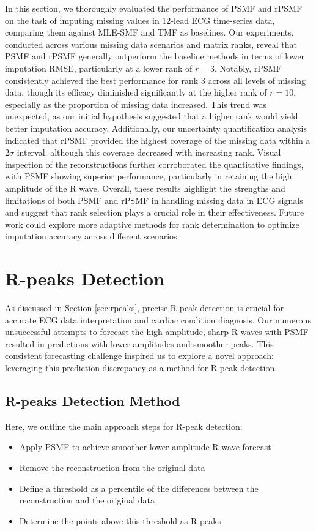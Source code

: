 \documentclass{mldsmsc}
\begin{document}
\noindent In this section, we thoroughly evaluated the performance of PSMF and rPSMF on the task of imputing missing values in 12-lead ECG time-series data, comparing them against MLE-SMF and TMF as baselines. Our experiments, conducted across various missing data scenarios and matrix ranks, reveal that PSMF and rPSMF generally outperform the baseline methods in terms of lower imputation RMSE, particularly at a lower rank of $r = 3$. Notably, rPSMF consistently achieved the best performance for rank 3 across all levels of missing data, though its efficacy diminished significantly at the higher rank of $r = 10$, especially as the proportion of missing data increased. This trend was unexpected, as our initial hypothesis suggested that a higher rank would yield better imputation accuracy. Additionally, our uncertainty quantification analysis indicated that rPSMF provided the highest coverage of the missing data within a $2\sigma$ interval, although this coverage decreased with increasing rank. Visual inspection of the reconstructions further corroborated the quantitative findings, with PSMF showing superior performance, particularly in retaining the high amplitude of the R wave. Overall, these results highlight the strengths and limitations of both PSMF and rPSMF in handling missing data in ECG signals and suggest that rank selection plays a crucial role in their effectiveness. Future work could explore more adaptive methods for rank determination to optimize imputation accuracy across different scenarios.

\section{R-peaks Detection}

As discussed in Section \ref{sec:rpeaks}, precise R-peak detection is crucial for accurate ECG data interpretation and cardiac condition diagnosis. Our numerous unsuccessful attempts to forecast the high-amplitude, sharp R waves with PSMF resulted in predictions with lower amplitudes and smoother peaks. This consistent forecasting challenge inspired us to explore a novel approach: leveraging this prediction discrepancy as a method for R-peak detection.

\subsection{R-peaks Detection Method}

\noindent Here, we outline the main approach steps for R-peak detection:
\begin{itemize}
    \item Apply PSMF to achieve smoother lower amplitude R wave forecast
    \item Remove the reconstruction from the original data
    \item Define a threshold as a percentile of the differences between the reconstruction and the original data
    \item Determine the points above this threshold as R-peaks
\end{itemize}
\end{document}
